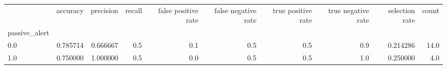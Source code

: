 \begin{tabular}{lrrrrrrrrr}
\toprule
{} &  accuracy &  precision &  recall &  false positive rate &  false negative rate &  true positive rate &  true negative rate &  selection rate &  count \\
passive\_alert &           &            &         &                      &                      &                     &                     &                 &        \\
\midrule
0.0           &  0.785714 &   0.666667 &     0.5 &                  0.1 &                  0.5 &                 0.5 &                 0.9 &        0.214286 &   14.0 \\
1.0           &  0.750000 &   1.000000 &     0.5 &                  0.0 &                  0.5 &                 0.5 &                 1.0 &        0.250000 &    4.0 \\
\bottomrule
\end{tabular}
